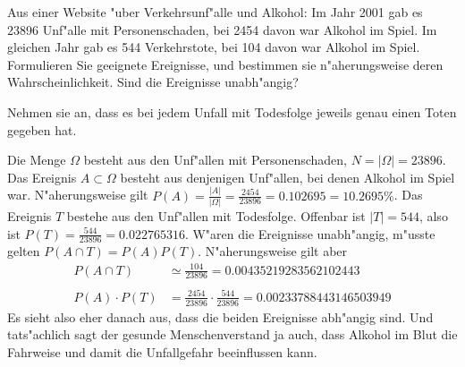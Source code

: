 Aus einer Website "uber Verkehrsunf"alle und Alkohol: Im Jahr 2001
gab es 23896 Unf"alle mit Personenschaden, bei 2454 davon war
Alkohol im Spiel. Im gleichen Jahr gab es 544 Verkehrstote, bei 104
davon war Alkohol im Spiel. Formulieren Sie geeignete Ereignisse, und
bestimmen sie n"aherungsweise deren Wahrscheinlichkeit. Sind die Ereignisse
unabh"angig?

\begin{hinweis}
Nehmen sie an, dass es bei jedem Unfall mit Todesfolge jeweils
genau einen Toten gegeben hat.
\end{hinweis}

\begin{loesung}
Die Menge $\Omega$ besteht aus den Unf"allen mit Personenschaden,
$N=|\Omega|=23896$. Das Ereignis $A\subset \Omega$ besteht aus denjenigen
Unf"allen, bei denen Alkohol im Spiel war. N"aherungsweise gilt $P(A)=\frac{|A|}{|\Omega|}=\frac{2454}{23896}=0.102695=10.2695\%$.
Das Ereignis $T$ bestehe aus den
Unf"allen mit Todesfolge. Offenbar ist
$|T| = 544$, also ist $P(T) = \frac{544}{23896}=0.022765316$.
W"aren die Ereignisse unabh"angig, m"usste gelten
$ P(A\cap T)=P(A)P(T) $. N"aherungsweise gilt aber
\begin{align*}
P(A\cap T)&\simeq\frac{104}{23896}=0.00435219283562102443\\
\\
P(A)\cdot P(T)&=\frac{2454}{23896}\cdot\frac{544}{23896}=0.00233788443146503949
\end{align*}
Es sieht also eher danach aus, dass die beiden Ereignisse
abh"angig sind. Und tats"achlich sagt der gesunde Menschenverstand ja auch,
dass Alkohol im Blut die Fahrweise und damit die Unfallgefahr beeinflussen
kann.
\end{loesung}

